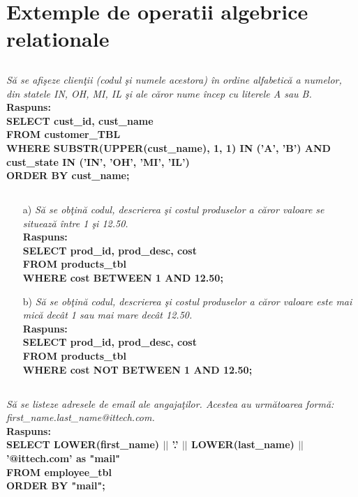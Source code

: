 \documentclass[a4paper,12pt]{article}
\begin{document}
	\section{Extemple de operatii algebrice relationale}
	
	\subsection{}
		\textit{Să se afişeze clienţii (codul şi numele acestora) în ordine alfabetică a numelor, din statele IN, OH, MI, IL şi ale căror nume încep cu literele A sau B.\\}
		\textbf{Raspuns:\\SELECT cust\_id, cust\_name\\
			FROM customer\_TBL\\
			WHERE SUBSTR(UPPER(cust\_name), 1, 1) IN ('A', 'B') AND cust\_state IN ('IN', 'OH', 'MI', 'IL')\\ 
			ORDER BY cust\_name;}
	
	\subsection{}
	\begin{itemize}
	\item[a)] \emph{Să se obţină codul, descrierea şi costul produselor a căror valoare se situează între 1 şi 12.50.\\}
	\textbf{Raspuns:\\SELECT prod\_id, prod\_desc, cost\\
		FROM products\_tbl\\
		WHERE cost BETWEEN 1 AND 12.50;\\}
	
	\item[b)] \emph{Să se obţină codul, descrierea şi costul produselor a căror valoare este mai mică decât 1 sau mai mare decât 12.50.\\}
	\textbf{Raspuns:\\SELECT prod\_id, prod\_desc, cost\\
		FROM products\_tbl\\
		WHERE cost NOT BETWEEN 1 AND 12.50;\\}
	\end{itemize}
	
	\subsection{}
	\textit{Să se listeze adresele de email ale angajaţilor. Acestea au următoarea formă:
		first\_name.last\_name@ittech.com.\\}
	\textbf{Raspuns:\\
		SELECT LOWER(first\_name) $||$ '.' $||$ LOWER(last\_name) $||$ '@ittech.com' as "mail"\\
		FROM employee\_tbl\\
		ORDER BY "mail";}
	
\end{document}
